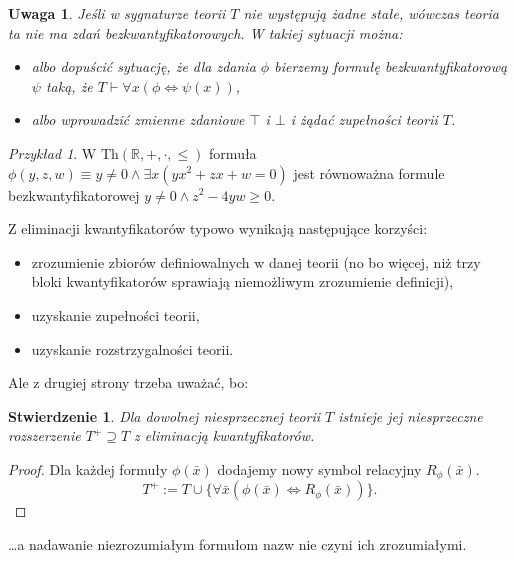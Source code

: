 \documentclass{article}
\newcommand{\R}{\mathbb{R}}
\theoremstyle{plain}
\newtheorem{stw}[thm]{Stwierdzenie}
\newtheorem{uw}[thm]{Uwaga}
\theoremstyle{definition}
\theoremstyle{remark}
\newtheorem{prz}[thm]{Przykład}
\newcommand{\Th}{\text{Th}}
\begin{document}
\begin{uw}
	Jeśli w sygnaturze teorii $T$ nie występują żadne stałe, wówczas teoria
	ta nie ma zdań bezkwantyfikatorowych. W takiej sytuacji można:
	\begin{itemize}
		\item albo dopuścić sytuację, że dla zdania $\phi$ bierzemy
			formułę bezkwantyfikatorową $\psi$ taką, że $T \vdash
			\forall x (\phi \iff \psi(x))$,
		\item albo wprowadzić zmienne zdaniowe $\top$ i $\bot$ i żądać
			zupełności teorii $T$.
	\end{itemize}
\end{uw}

\begin{prz}
	W $\Th(\R, +, \cdot, \leq)$ formuła $\phi(y, z, w) \equiv y \neq 0
	\wedge \exists x (yx^2 + zx + w = 0)$ jest równoważna formule
	bezkwantyfikatorowej $y \neq 0 \wedge z^2 - 4yw \geq 0$.
\end{prz}

Z eliminacji kwantyfikatorów typowo wynikają następujące korzyści:
\begin{itemize}
	\item zrozumienie zbiorów definiowalnych w danej teorii (no bo więcej,
		niż trzy bloki kwantyfikatorów sprawiają niemożliwym
		zrozumienie definicji),
	\item uzyskanie zupełności teorii,
	\item uzyskanie rozstrzygalności teorii.
\end{itemize}

Ale z drugiej strony trzeba uważać, bo:

\begin{stw} Dla dowolnej niesprzecznej teorii $T$ istnieje jej niesprzeczne
	rozszerzenie $T^+ \supseteq T$ z eliminacją kwantyfikatorów.
\end{stw}
\begin{proof}
	Dla każdej formuły $\phi(\bar{x})$ dodajemy nowy symbol relacyjny
	$R_{\phi}(\bar{x}).$
	\[T^+ := T \cup \{\forall \bar{x} (\phi(\bar{x}) \iff
	R_{\phi}(\bar{x}))\}.\]
\end{proof}
\ldots a nadawanie niezrozumiałym formułom nazw nie czyni ich zrozumiałymi.
\end{document}
